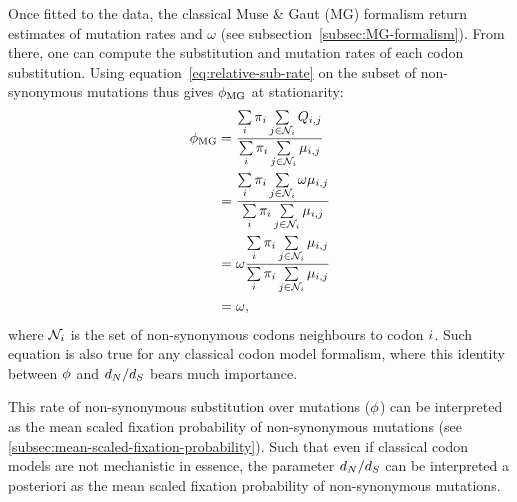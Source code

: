 Once fitted to the data, the classical Muse \& Gaut (MG) formalism return estimates of mutation rates and $\omega$ (see subsection~\ref{subsec:MG-formalism}).
From there, one can compute the substitution and mutation rates of each codon substitution.
Using equation~\ref{eq:relative-sub-rate} on the subset of non-synonymous mutations thus gives $\phi_{\text{MG}}$ at stationarity:
\begin{align}
    \phi_{\text{MG}} & = \dfrac{ \sum\limits_{{i}} \pi_{{i}} \sum\limits_{{j} \in \mathcal{N}_{{i}}} Q_{{i}, {j}}}{\sum\limits_{{i}} \pi_{{i}} \sum\limits_{{j} \in \mathcal{N}_{{i}}} \mu_{{i}, {j}}} \\
    & = \dfrac{ \sum\limits_{{i}} \pi_{{i}} \sum\limits_{{j} \in \mathcal{N}_{{i}}} \omega \mu_{{i}, {j}}}{\sum\limits_{{i}} \pi_{{i}} \sum\limits_{{j} \in \mathcal{N}_{{i}}} \mu_{{i}, {j}}} \\
    & = \omega \dfrac{ \sum\limits_{{i}} \pi_{{i}} \sum\limits_{{j} \in \mathcal{N}_{{i}}} \mu_{{i}, {j}}}{\sum\limits_{{i}} \pi_{{i}} \sum\limits_{{j} \in \mathcal{N}_{{i}}} \mu_{{i}, {j}}} \\
    & = \omega,
\end{align}
where $\mathcal{N}_{{i}}$ is the set of non-synonymous codons neighbours to codon ${i}$.
Such equation is also true for any classical codon model formalism, where this identity between $\phi$ and $d_N / d_S$ bears much importance.

This rate of non-synonymous substitution over mutations ($\phi$) can be interpreted as the mean scaled fixation probability of non-synonymous mutations (see \ref{subsec:mean-scaled-fixation-probability}).
Such that even if classical codon models are not mechanistic in essence, the parameter $d_N / d_S$ can be interpreted a posteriori as the mean scaled fixation probability of non-synonymous mutations.

